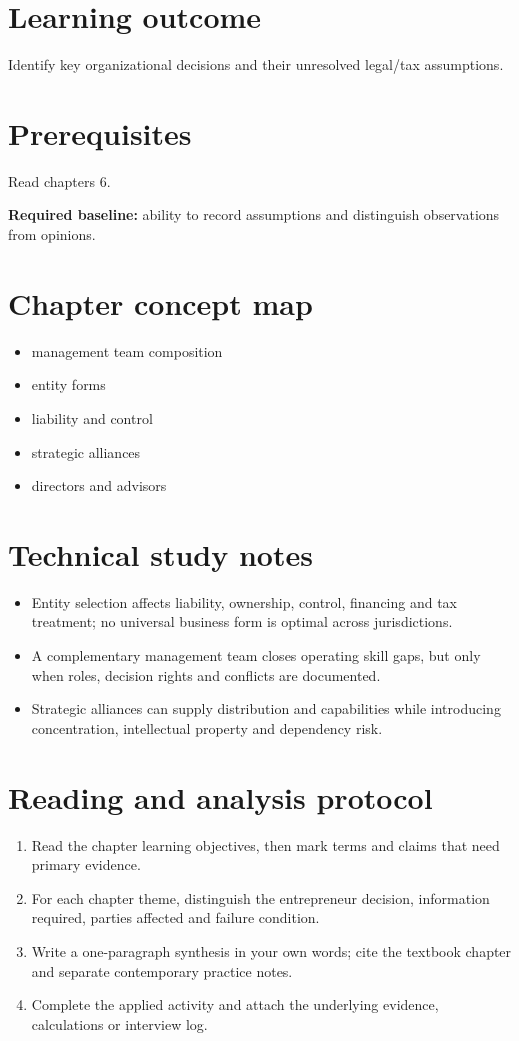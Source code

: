 \documentclass[11pt,letterpaper]{article}
\begin{document}
\SuiteOpen
\section{Learning outcome}
Identify key organizational decisions and their unresolved legal/tax assumptions.
\section{Prerequisites}
Read chapters 6.\par\textbf{Required baseline:} ability to record assumptions and distinguish observations from opinions.
\section{Chapter concept map}
\begin{itemize}[leftmargin=*,itemsep=3pt]
\item management team composition
\item entity forms
\item liability and control
\item strategic alliances
\item directors and advisors
\end{itemize}

\section{Technical study notes}
\begin{itemize}[leftmargin=*,itemsep=3pt]
\item Entity selection affects liability, ownership, control, financing and tax treatment; no universal business form is optimal across jurisdictions.
\item A complementary management team closes operating skill gaps, but only when roles, decision rights and conflicts are documented.
\item Strategic alliances can supply distribution and capabilities while introducing concentration, intellectual property and dependency risk.
\end{itemize}

\section{Reading and analysis protocol}
\begin{enumerate}[leftmargin=*,itemsep=5pt]
\item Read the chapter learning objectives, then mark terms and claims that need primary evidence.
\item For each chapter theme, distinguish the entrepreneur decision, information required, parties affected and failure condition.
\item Write a one-paragraph synthesis in your own words; cite the textbook chapter and separate contemporary practice notes.
\item Complete the applied activity and attach the underlying evidence, calculations or interview log.
\end{enumerate}
\end{document}
